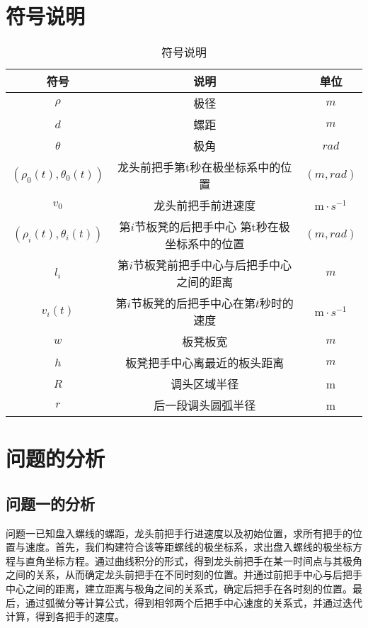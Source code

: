 \documentclass{cumcmthesis}
\begin{document}
\section{符号说明}
\begin{table}[h]
    \centering
    \caption{符号说明}
    \begin{tabular}{ccc}
    \hline
    符号 & 说明 & 单位  \\ 
    \hline
    $\rho$                 & 极径                     & $m$                      \\
    $d$                   & 螺距                      &   $m$                    \\
    $\theta $                    & 极角                     & $rad$                      \\
 \((\rho _0(t),\theta _0(t))\)       & 龙头前把手第t秒在极坐标系中的位置                   & $(m,rad) $                     \\
    \(v_0\)                      & 龙头前把手前进速度                     & $\mathrm{m}\cdot s^{-1} $              \\
\((\rho _{i}(t),\theta _{i}(t))\)                   & 第\(i\)节板凳的后把手中心 第t秒在极坐标系中的位置                     & $(m,rad) $                      \\
$l_i$             &   第$i$节板凳前把手中心与后把手中心之间的距离                   & $m$                      \\
  \(v_i(t)\)                     & 第\(i\)节板凳的后把手中心在第\(t\)秒时的速度                     &  $\mathrm{m}\cdot s^{-1} $                    \\
   $w$                      & 板凳板宽                     & $m$                      \\
    $h$                   & 板凳把手中心离最近的板头距离                     & $m$                       \\
  $R$                     & 调头区域半径                     & m                      \\
    $r$                      & 后一段调头圆弧半径                      & m                       \\
   \hline
    \end{tabular}
    \end{table}
\section{问题的分析}
\subsection{问题一的分析}
问题一已知盘入螺线的螺距，龙头前把手行进速度以及初始位置，求所有把手的位置与速度。首先，我们构建符合该等距螺线的极坐标系，求出盘入螺线的极坐标方程与直角坐标方程。通过曲线积分的形式，得到龙头前把手在某一时间点与其极角之间的关系，从而确定龙头前把手在不同时刻的位置。并通过前把手中心与后把手中心之间的距离，建立距离与极角之间的关系式，确定后把手在各时刻的位置。最后，通过弧微分等计算公式，得到相邻两个后把手中心速度的关系式，并通过迭代计算，得到各把手的速度。
\end{document}
